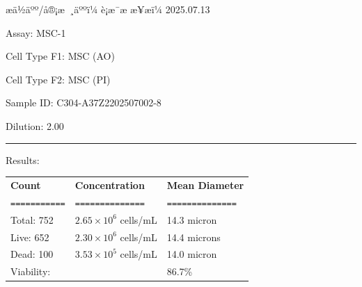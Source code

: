 \documentclass[UTF8,10pt,a4paper,fontset=fandol]{ctexart}
\newcommand{\fieldvalue}[1]{#1}
\newcommand{\handwritten}[1]{#1}
\begin{document}
\vfill

æä½äºº/å®¡æ ¸äººï¼%
\fieldvalue{\handwritten{è¡æ¯æ}}
\hfill
æ¥æï¼%
\fieldvalue{\handwritten{2025.07.13}}

\newpage

\noindent
Assay: %
\fieldvalue{MSC-1}

\medskip
\noindent
Cell Type F1: %
\fieldvalue{MSC (AO)}

\medskip
\noindent
Cell Type F2: %
\fieldvalue{MSC (PI)}

\medskip
\noindent
Sample ID: %
\fieldvalue{C304-A37Z2202507002-8}

\medskip
\noindent
Dilution: %
\fieldvalue{2.00}

\medskip
\noindent\rule{\textwidth}{0.4pt}

\medskip
\noindent
Results:

\medskip
\small
\begin{tabularx}{\textwidth}{@{}>{\raggedright\arraybackslash}X
>{\raggedright\arraybackslash}X
>{\raggedright\arraybackslash}X@{}}
\textbf{Count} & \textbf{Concentration} & \textbf{Mean Diameter} \\[-1mm]
\texttt{===========} & \texttt{==============} & \texttt{==============} \\

Total:
%
\fieldvalue{752}
&
%
\fieldvalue{$2.65\times10^{6}$ cells/mL}
&
%
\fieldvalue{14.3 micron}
\\

Live:
%
\fieldvalue{652}
&
%
\fieldvalue{$2.30\times10^{6}$ cells/mL}
&
%
\fieldvalue{14.4 microns}
\\

Dead:
%
\fieldvalue{100}
&
%
\fieldvalue{$3.53\times10^{5}$ cells/mL}
&
%
\fieldvalue{14.0 micron}
\\

Viability:
&
&
%
\fieldvalue{86.7\%}
\end{tabularx}
\normalsize
\end{document}

